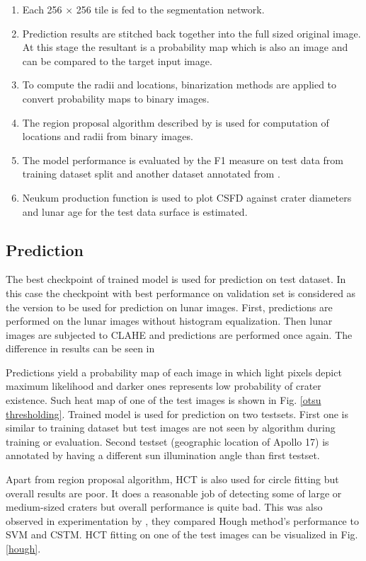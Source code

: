 \documentclass[11pt]{article}
\begin{document}
\begin{enumerate}
	\item Each 256 $\times$ 256 tile is fed to the segmentation network.
	\item Prediction results are stitched back together into the full sized original image. At this stage the resultant is a probability map which is also an image and can be compared to the target input image.
	\item To compute the radii and locations, binarization methods are applied to convert probability maps to binary images.
	\item The region proposal algorithm described by \cite{reiss1993recognizing} is used for computation of locations and radii from binary images.
	\item The model performance is evaluated by the F1 measure on test data from training dataset split and another dataset annotated from \cite{dino2020}.
	\item Neukum production function is used to plot CSFD against crater diameters and lunar age for the test data surface is estimated.
\end{enumerate}

\subsection{Prediction}
The best checkpoint of trained model is used for prediction on test dataset. In this case the checkpoint with best performance on validation set is considered as the version to be used for prediction on lunar images. First, predictions are performed on the lunar images without histogram equalization. Then lunar images are subjected to CLAHE and predictions are performed once again. The difference in results can be seen in  

Predictions yield a probability map of each image in which light pixels depict maximum likelihood and darker ones represents low probability of crater existence. Such heat map of one of the test images is shown in Fig. \ref{otsu thresholding}. Trained model is used for prediction on two testsets. First one is similar to training dataset but test images are not seen by algorithm during training or evaluation. Second testset (geographic location of Apollo 17) is annotated by \cite{dino2020} having a different sun illumination angle than first testset.

Apart from region proposal algorithm, HCT is also used for circle fitting but overall results are poor. It does a reasonable job of detecting some of large or medium-sized craters but overall performance is quite bad. This was also observed in experimentation by \cite{wetzler2005learning}, they compared Hough method's performance to SVM and CSTM. HCT fitting on one of the test images can be visualized in Fig. \ref{hough}.
\end{document}
